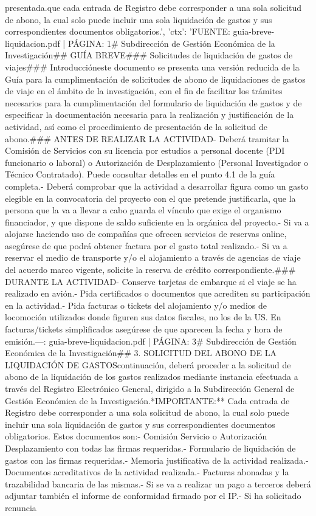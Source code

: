 \documentclass{article}
\begin{document}
\begin{itemize}
presentada.\n\nRecuerda que cada entrada de Registro debe corresponder a una sola solicitud de abono, la cual solo puede incluir una sola liquidación de gastos y sus correspondientes documentos obligatorios.', 'ctx': 'FUENTE: guia-breve-liquidacion.pdf | PÁGINA: 1\n# Subdirección de Gestión Económica de la Investigación\n\n## GUÍA BREVE\n### Solicitudes de liquidación de gastos de viajes\n\n### Introducción\n\nEn este documento se presenta una versión reducida de la Guía para la cumplimentación de solicitudes de abono de liquidaciones de gastos de viaje en el ámbito de la investigación, con el fin de facilitar los trámites necesarios para la cumplimentación del formulario de liquidación de gastos y de especificar la documentación necesaria para la realización y justificación de la actividad, así como el procedimiento de presentación de la solicitud de abono.\n\n### ANTES DE REALIZAR LA ACTIVIDAD\n\n- Deberá tramitar la Comisión de Servicios con su licencia por estudios a personal docente (PDI funcionario o laboral) o Autorización de Desplazamiento (Personal Investigador o Técnico Contratado). Puede consultar detalles en el punto 4.1 de la guía completa.\n\n- Deberá comprobar que la actividad a desarrollar figura como un gasto elegible en la convocatoria del proyecto con el que pretende justificarla, que la persona que la va a llevar a cabo guarda el vínculo que exige el organismo financiador, y que dispone de saldo suficiente en la orgánica del proyecto.\n\n- Si va a alojarse haciendo uso de compañías que ofrecen servicios de reservas online, asegúrese de que podrá obtener factura por el gasto total realizado.\n\n- Si va a reservar el medio de transporte y/o el alojamiento a través de agencias de viaje del acuerdo marco vigente, solicite la reserva de crédito correspondiente.\n\n### DURANTE LA ACTIVIDAD\n\n- Conserve tarjetas de embarque si el viaje se ha realizado en avión.\n- Pida certificados o documentos que acrediten su participación en la actividad.\n- Pida facturas o tickets del alojamiento y/o medios de locomoción utilizados donde figuren sus datos fiscales, no los de la US. En facturas/tickets simplificados asegúrese de que aparecen la fecha y hora de emisión.\n\n---\n\nFUENTE: guia-breve-liquidacion.pdf | PÁGINA: 3\n# Subdirección de Gestión Económica de la Investigación\n\n## 3. SOLICITUD DEL ABONO DE LA LIQUIDACIÓN DE GASTOS\n\nA continuación, deberá proceder a la solicitud de abono de la liquidación de los gastos realizados mediante instancia efectuada a través del Registro Electrónico General, dirigido a la Subdirección General de Gestión Económica de la Investigación.\n\n**IMPORTANTE:** Cada entrada de Registro debe corresponder a una sola solicitud de abono, la cual solo puede incluir una sola liquidación de gastos y sus correspondientes documentos obligatorios. Estos documentos son:\n\n- Comisión Servicio o Autorización Desplazamiento con todas las firmas requeridas.\n- Formulario de liquidación de gastos con las firmas requeridas.\n- Memoria justificativa de la actividad realizada.\n- Documentos acreditativos de la actividad realizada.\n- Facturas abonadas y la trazabilidad bancaria de las mismas.\n- Si se va a realizar un pago a terceros deberá adjuntar también el informe de conformidad firmado por el IP.\n- Si ha solicitado renuncia 
\end{itemize}
\end{document}
